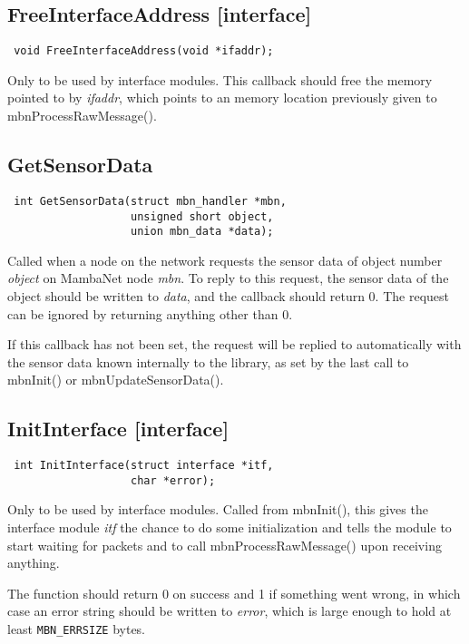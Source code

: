 \subsection{FreeInterfaceAddress \footnotesize{[interface]}}
\begin{verbatim}
 void FreeInterfaceAddress(void *ifaddr);
\end{verbatim}
Only to be used by interface modules. This callback should free the memory pointed to by \textit{ifaddr}, which points to an memory location previously given to mbnProcessRawMessage().


\subsection{GetSensorData}
\begin{verbatim}
 int GetSensorData(struct mbn_handler *mbn,
                   unsigned short object,
                   union mbn_data *data);
\end{verbatim}
Called when a node on the network requests the sensor data of object number \textit{object} on MambaNet node \textit{mbn}. To reply to this request, the sensor data of the object should be written to \textit{data}, and the callback should return 0. The request can be ignored by returning anything other than 0.

If this callback has not been set, the request will be replied to automatically with the sensor data known internally to the library, as set by the last call to mbnInit() or mbnUpdateSensorData().


\subsection{InitInterface \footnotesize{[interface]}}
\begin{verbatim}
 int InitInterface(struct interface *itf,
                   char *error);
\end{verbatim}
Only to be used by interface modules. Called from mbnInit(), this gives the interface module \textit{itf} the chance to do some initialization and tells the module to start waiting for packets and to call mbnProcessRawMessage() upon receiving anything.

The function should return 0 on success and 1 if something went wrong, in which case an error string should be written to \textit{error}, which is large enough to hold at least \verb|MBN_ERRSIZE| bytes.


